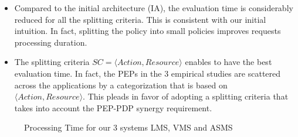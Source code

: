 \begin{itemize} 
\item Compared to the initial architecture (IA), the evaluation time is considerably reduced for all the splitting criteria. This is consistent with our 
initial intuition. In fact, splitting the policy into small policies improves requests processing duration.
\item The splitting criteria \normalsize $SC=\langle Action, Resource\rangle$ enables to have the best evaluation time. 
In fact, the PEPs in the 3 empirical studies are scattered across the applications by a categorization 
that is based on $\langle Action, Resource\rangle$. This pleads in favor of adopting a splitting criteria that takes into account the PEP-PDP synergy requirement.
\end{itemize} 
\begin{figure}
  \centering
  \caption{Processing Time for our 3 systems LMS, VMS and ASMS}
  \label{fig:processing time}
\end{figure}
